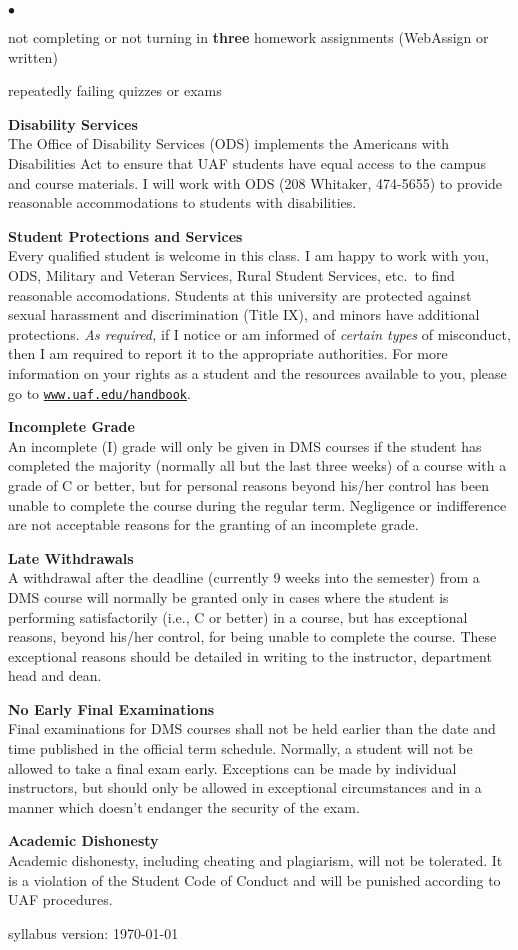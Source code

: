 \documentclass[12pt]{article}
\renewcommand{\emph}[1]{\textsf{\textbf{#1}}}
\newcommand{\localhead}[1]{\par\smallskip\textbf{#1}\nobreak\\}%
\def\heading#1{\localhead{\large\emph{#1}}}
\def\subheading#1{\localhead{\emph{#1}}}
\newenvironment{clist}%
{\bgroup\parskip 0pt\begin{list}{$\bullet$}{\partopsep 4pt\topsep 0pt\itemsep -2pt}}%
{\end{list}\egroup}%
\begin{document}
\begin{clist}
\item not completing or not turning in \textbf{three} homework assignments (WebAssign or written)
\item repeatedly failing quizzes or exams
\end{clist}

\subheading{Disability Services}
The Office of Disability Services (ODS) implements the Americans with Disabilities Act to ensure that UAF students have equal access to the campus and course materials.  I will work with ODS (208 Whitaker, 474-5655) to provide reasonable accommodations to students with disabilities.

\subheading{Student Protections and Services}
Every qualified student is welcome in this class.  I am happy to work with you, ODS, Military and Veteran Services, Rural Student Services, etc.~to find reasonable accomodations.  Students at this university are protected against sexual harassment and discrimination (Title IX), and minors have additional protections. \textit{As required,} if I notice or am informed of \textit{certain types} of misconduct, then I am required to report it to the appropriate authorities.  For more information on your rights as a student and the resources available to you, please go to \href{https://www.uaf.edu/handbook/}{\texttt{www.uaf.edu/handbook}}.

\subheading{Incomplete Grade} 
An incomplete (I) grade will only be given in DMS courses if the student has completed the majority (normally all but the last three weeks) of a course with a grade of C or better, but for personal reasons beyond his/her control has been unable to complete the course during the regular term. Negligence or indifference are not acceptable reasons for the granting of an incomplete grade. 

\subheading{Late Withdrawals} 
A withdrawal after the deadline (currently 9 weeks into the semester) from a DMS course will normally be granted only in cases where the student is performing satisfactorily (i.e., C or better) in a course, but has exceptional reasons, beyond his/her control, for being unable to complete the course. These exceptional reasons should be detailed in writing to the instructor, department head and dean.

\subheading{No Early Final Examinations}
Final examinations for DMS courses shall not be held earlier than the date and time published in the official term schedule. Normally, a student will not be allowed to take a final exam early. Exceptions can be made by individual instructors, but should only be allowed in exceptional circumstances and in a manner which doesn't endanger the security of the exam.

\subheading{Academic Dishonesty}
Academic dishonesty, including cheating and plagiarism, will not be tolerated.  It is a violation of the Student Code of Conduct and will be punished according to UAF procedures.

\vfill
\hfill \scriptsize syllabus version: \today \normalsize

\end{document}
